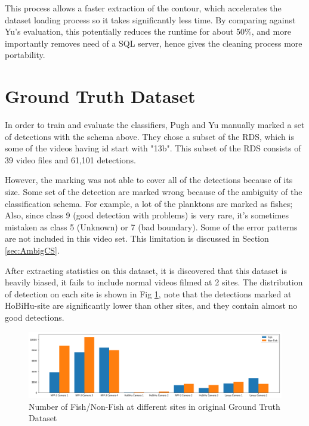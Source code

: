 \documentclass[bsc,logo,twoside,fullspacing,parskip]{infthesis}
\begin{document}
This process allows a faster extraction of the contour, which accelerates the dataset loading process so it takes significantly less time. 
By comparing against Yu's\cite{Yu} evaluation, this potentially reduces the runtime for about 50\%, and more importantly removes need of a SQL server, hence gives the cleaning process more portability.

\section{Ground Truth Dataset}
\label{sec:gt}

In order to train and evaluate the classifiers, Pugh and Yu manually marked a set of detections with the schema above. They chose a subset of the RDS, which is some of the videos having id start with "13b". This subset of the RDS consists of 39 video files and 61,101 detections. 

However, the marking was not able to cover all of the detections because of its size. 
Some set of the detection are marked wrong because of the ambiguity of the classification schema. 
For example, a lot of the planktons are marked as fishes; Also, since class 9 (good detection with problems) is very rare, it's sometimes mistaken as class 5 (Unknown) or 7 (bad boundary). Some of the error patterns are not included in this video set. This limitation is discussed in Section \ref{sec:AmbigCS}.

After extracting statistics on this dataset, it is discovered that this dataset is heavily biased, it fails to include normal videos filmed at 2 sites. The distribution of detection on each site is shown in Fig \ref{fig:gtdist}, note that the detections marked at HoBiHu-site are significantly lower than other sites, and they contain almost no good detections.

\begin{figure}[h]
    \centering
    \includegraphics[scale=0.34]{graph/classdist.png}
    \caption{Number of Fish/Non-Fish at different sites in original Ground Truth Dataset}
    \label{fig:gtdist}
\end{figure}
\end{document}
